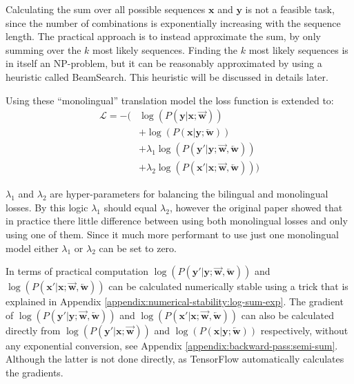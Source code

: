 Calculating the sum over all possible sequences $\mathbf{x}$ and $\mathbf{y}$ is not a feasible task, since the number of combinations is exponentially increasing with the sequence length. The practical approach is to instead approximate the sum, by only summing over the $k$ most likely sequences. Finding the $k$ most likely sequences is in itself an NP-problem, but it can be reasonably approximated by using a heuristic called BeamSearch. This heuristic will be discussed in details later.

Using these ``monolingual'' translation model the loss function is extended to:
\begin{equation}
\begin{aligned}
\mathcal{L} = -\big(&\log(P(\mathbf{y}|\mathbf{x};\overrightarrow{\mathbf{w}})) \\
    &+ \log(P(\mathbf{x}|\mathbf{y};\overleftarrow{\mathbf{w}})) \\
    &+ \lambda_1 \log(P(\mathbf{y'}|\mathbf{y};\overrightarrow{\mathbf{w}},\overleftarrow{\mathbf{w}})) \\
    &+ \lambda_2 \log(P(\mathbf{x'}|\mathbf{x};\overrightarrow{\mathbf{w}},\overleftarrow{\mathbf{w}})) \big)
\end{aligned}
\end{equation}

$\lambda_1$ and $\lambda_2$ are hyper-parameters for balancing the bilingual and monolingual losses. By this logic $\lambda_1$ should equal $\lambda_2$, however the original paper \cite{semi-supervised} showed that in practice there little difference between using both monolingual losses and only using one of them. Since it much more performant to use just one monolingual model either $\lambda_1$ or $\lambda_2$ can be set to zero.

In terms of practical computation $\log(P(\mathbf{y'}|\mathbf{y};\overrightarrow{\mathbf{w}},\overleftarrow{\mathbf{w}}))$ and $\log(P(\mathbf{x'}|\mathbf{x};\overrightarrow{\mathbf{w}},\overleftarrow{\mathbf{w}}))$ can be calculated numerically stable using a trick that is explained in Appendix \ref{appendix:numerical-stability:log-sum-exp}. The gradient of $\log(P(\mathbf{y'}|\mathbf{y};\overrightarrow{\mathbf{w}},\overleftarrow{\mathbf{w}}))$ and $\log(P(\mathbf{x'}|\mathbf{x};\overrightarrow{\mathbf{w}},\overleftarrow{\mathbf{w}}))$ can also be calculated directly from $\log(P(\mathbf{y'}|\mathbf{x};\overrightarrow{\mathbf{w}}))$ and $\log(P(\mathbf{x}|\mathbf{y};\overleftarrow{\mathbf{w}}))$ respectively, without any exponential conversion, see Appendix \ref{appendix:backward-pass:semi-sum}. Although the latter is not done directly, as TensorFlow automatically calculates the gradients.

